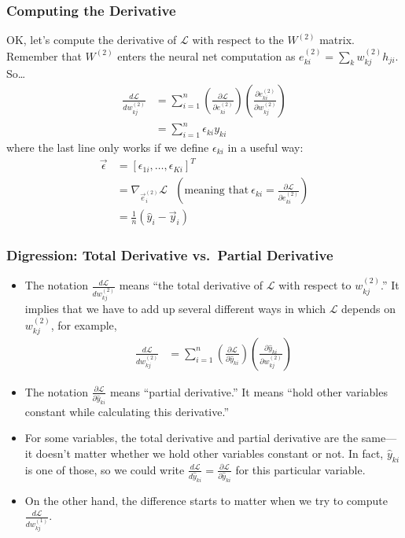 \documentclass{beamer}
\begin{document}
\begin{frame}
  \frametitle{Computing the Derivative}
  OK, let's compute the derivative of ${\mathcal L}$ with respect to the $W^{(2)}$
  matrix.  Remember that $W^{(2)}$ enters the neural net computation as
  $e_{ki}^{(2)}=\sum_k w_{kj}^{(2)}h_{ji}$.  So\ldots
  \begin{align*}
    \frac{d{\mathcal L}}{dw_{kj}^{(2)}} &=
    \sum_{i=1}^n
    \left(\frac{\partial{\mathcal L}}{\partial e_{ki}^{(2)}}\right)
    \left(\frac{\partial e_{ki}^{(2)}}{\partial w_{kj}^{(2)}}\right)\\
    &= \sum_{i=1}^n \epsilon_{ki}y_{ki}
  \end{align*}
  where the last line only works if we define $\epsilon_{ki}$ in
  a useful way:
  \begin{align*}
    \vec\epsilon &= [\epsilon_{1i},\ldots,\epsilon_{Ki}]^T \\
    &= \nabla_{\vec{e}_{i}^{(2)}}{\mathcal L}~~~
    \left(\mbox{meaning that}~\epsilon_{ki}=\frac{\partial{\mathcal L}}{\partial e_{ki}^{(2)}}\right)\\
    &= \frac{1}{n}(\hat{y}_{i}-\vec{y}_{i})
  \end{align*}
\end{frame}

\begin{frame}
  \frametitle{Digression: Total Derivative vs.~Partial Derivative}
  \begin{itemize}
  \item The notation $\frac{d{\mathcal L}}{dw_{kj}^{(2)}}$ means
    ``the total derivative of ${\mathcal L}$ with respect to
    $w_{kj}^{(2)}$.'' It implies that we have to add up several
    different ways in which ${\mathcal L}$ depends on
    $w_{kj}^{(2)}$, for example,
    \begin{align*}
      \frac{d{\mathcal L}}{dw_{kj}^{(2)}} &=
      \sum_{i=1}^n
      \left(\frac{\partial{\mathcal L}}{\partial\hat{y}_{ki}}\right)
      \left(\frac{\partial\hat{y}_{ki}}{\partial w_{kj}^{(2)}}\right)
    \end{align*}
  \item The notation $\frac{\partial{\mathcal
      L}}{\partial\hat{y}_{ki}}$ means ``partial derivative.''  It
    means ``hold other variables constant while calculating this
    derivative.''
  \item For some variables, the total derivative and partial
    derivative are the same---it doesn't matter whether we hold other
    variables constant or not.  In fact, $\hat{y}_{ki}$ is one of
    those, so we could write $\frac{d{\mathcal
        L}}{d\hat{y}_{ki}}=\frac{\partial{\mathcal
        L}}{\partial\hat{y}_{ki}}$ for this particular variable.
  \item On the other hand, the difference starts to matter when we try
    to compute $\frac{d{\mathcal L}}{d w_{kj}^{(1)}}$.
  \end{itemize}
\end{frame}
\end{document}
